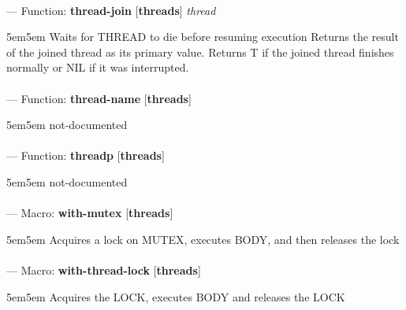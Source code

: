 \paragraph{}
\label{THREADS:THREAD-JOIN}
--- Function: \textbf{thread-join} [\textbf{threads}] \textit{thread}

\begin{adjustwidth}{5em}{5em}
Waits for THREAD to die before resuming execution
Returns the result of the joined thread as its primary value.
Returns T if the joined thread finishes normally or NIL if it was interrupted.
\end{adjustwidth}

\paragraph{}
\label{THREADS:THREAD-NAME}
--- Function: \textbf{thread-name} [\textbf{threads}] \textit{}

\begin{adjustwidth}{5em}{5em}
not-documented
\end{adjustwidth}

\paragraph{}
\label{THREADS:THREADP}
--- Function: \textbf{threadp} [\textbf{threads}] \textit{}

\begin{adjustwidth}{5em}{5em}
not-documented
\end{adjustwidth}

\paragraph{}
\label{THREADS:WITH-MUTEX}
--- Macro: \textbf{with-mutex} [\textbf{threads}] \textit{}

\begin{adjustwidth}{5em}{5em}
Acquires a lock on MUTEX, executes BODY, and then releases the lock
\end{adjustwidth}

\paragraph{}
\label{THREADS:WITH-THREAD-LOCK}
--- Macro: \textbf{with-thread-lock} [\textbf{threads}] \textit{}

\begin{adjustwidth}{5em}{5em}
Acquires the LOCK, executes BODY and releases the LOCK
\end{adjustwidth}

